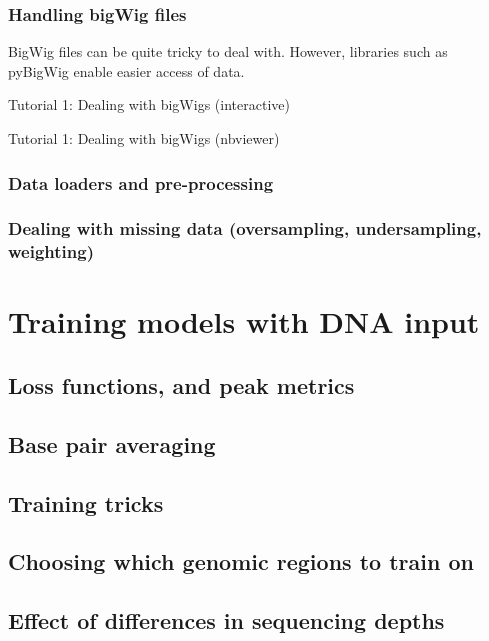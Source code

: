 \documentclass[
]{book}
\begin{document}
\section{Handling bigWig files}\label{handling-bigwig-files}

BigWig files can be quite tricky to deal with. However, libraries such as pyBigWig enable easier access of data.

Tutorial 1: Dealing with bigWigs (interactive)

Tutorial 1: Dealing with bigWigs (nbviewer)

\section{Data loaders and pre-processing}\label{data-loaders-and-pre-processing}

\section{Dealing with missing data (oversampling, undersampling, weighting)}\label{dealing-with-missing-data-oversampling-undersampling-weighting}

\part{Training models with DNA input}\label{part-training-models-with-dna-input}

\chapter{Loss functions, and peak metrics}\label{loss-functions-and-peak-metrics}

\chapter{Base pair averaging}\label{base-pair-averaging}

\chapter{Training tricks}\label{training-tricks}

\chapter{Choosing which genomic regions to train on}\label{choosing-which-genomic-regions-to-train-on}

\chapter{Effect of differences in sequencing depths}\label{effect-of-differences-in-sequencing-depths}
\end{document}
